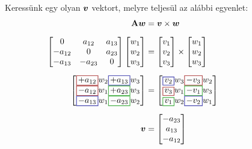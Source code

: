 \documentclass[main.tex]{subfiles}
\begin{document}
Keressünk egy olyan $\boldsymbol{v}$ vektort,
melyre teljesül az alábbi egyenlet:
\begin{align*}
  \rmat{A}\rvec{w}
   & = \rvec{v} \cross \rvec{w}
  \\[
  2mm
  ]
  \begin{bmatrix}
    0       & a_{12}  & a_{13} \\
    -a_{12} & 0       & a_{23} \\
    -a_{13} & -a_{23} & 0
  \end{bmatrix}
  \begin{bmatrix}
    w_1 \\
    w_2 \\
    w_3
  \end{bmatrix}
   & =
  \begin{bmatrix}
    v_1 \\
    v_2 \\
    v_3
  \end{bmatrix}
  \cross
  \begin{bmatrix}
    w_1 \\
    w_2 \\
    w_3
  \end{bmatrix}
  \\[
  2mm
  ]
  \begin{bmatrix}
    \rected{$+a_{12}$}{red}  w_2 \rected{$+a_{13}$}{blue}  w_3 \\
    \rected{$-a_{12}$}{red}  w_1 \rected{$+a_{23}$}{green} w_3 \\
    \rected{$-a_{13}$}{blue} w_1 \rected{$-a_{23}$}{green} w_2
  \end{bmatrix}
   & =
  \begin{bmatrix}
    \rected{$v_2$}{blue}  w_3 \rected{$-v_3$}{red}   w_2 \\
    \rected{$v_3$}{red}   w_1 \rected{$-v_1$}{green} w_3 \\
    \rected{$v_1$}{green} w_2 \rected{$-v_2$}{blue}  w_1
  \end{bmatrix}
  \hspace{20mm}
  \\[
  2mm
  ]
  \rvec{v}
   & =
  \begin{bmatrix}
    -a_{23} \\
    a_{13}  \\
    -a_{12} \\
  \end{bmatrix}
\end{align*}


\end{document}
